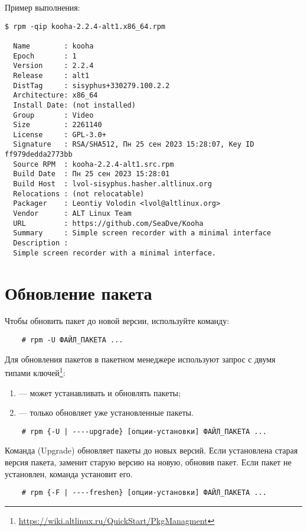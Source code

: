 Пример выполнения:
\begin{verbatim}
$ rpm -qip kooha-2.2.4-alt1.x86_64.rpm

  Name        : kooha
  Epoch       : 1
  Version     : 2.2.4
  Release     : alt1
  DistTag     : sisyphus+330279.100.2.2
  Architecture: x86_64
  Install Date: (not installed)
  Group       : Video
  Size        : 2261140
  License     : GPL-3.0+
  Signature   : RSA/SHA512, Пн 25 сен 2023 15:28:07, Key ID ff979dedda2773bb
  Source RPM  : kooha-2.2.4-alt1.src.rpm
  Build Date  : Пн 25 сен 2023 15:28:01
  Build Host  : lvol-sisyphus.hasher.altlinux.org
  Relocations : (not relocatable)
  Packager    : Leontiy Volodin <lvol@altlinux.org>
  Vendor      : ALT Linux Team
  URL         : https://github.com/SeaDve/Kooha
  Summary     : Simple screen recorder with a minimal interface
  Description :
  Simple screen recorder with a minimal interface.
\end{verbatim}

\section{Обновление пакета}
Чтобы обновить пакет до новой версии, используйте команду:
\begin{verbatim}
    # rpm -U ФАЙЛ_ПАКЕТА ...
\end{verbatim}

Для обновления пакетов в пакетном менеджере  используют запрос с двумя типами ключей\footnote{\href{https://wiki.altlinux.ru/QuickStart/PkgManagment}{https://wiki.altlinux.ru/QuickStart/PkgManagment}}:
\begin{enumerate}
	\item {} --- может устанавливать и обновлять пакеты;
	\item {} --- только обновляет уже установленные пакеты.
\end{enumerate}

\begin{verbatim}
    # rpm {-U | ----upgrade} [опции-установки] ФАЙЛ_ПАКЕТА ...
\end{verbatim}

Команда  (Upgrade) обновляет пакеты до новых версий. Если установлена 
старая версия пакета,  заменит старую версию на новую, обновив пакет. 
Если пакет не установлен, команда  установит его.

\begin{verbatim}
    # rpm {-F | ----freshen} [опции-установки] ФАЙЛ_ПАКЕТА ...
\end{verbatim}

